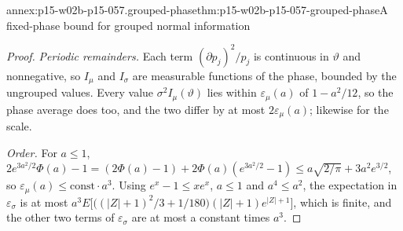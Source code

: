 \begin{annexitem}{annex:p15-w02b-p15-057.grouped-phase}{thm:p15-w02b-p15-057-grouped-phase}{A fixed-phase bound for grouped normal information}
\begin{proof}
\emph{Periodic remainders.} Each term \((\partial p_j)^2/p_j\) is
continuous in \(\vartheta\) and nonnegative, so \(I_\mu\) and \(I_\sigma\)
are measurable functions of the phase, bounded by the ungrouped values.
Every value \(\sigma^2I_\mu(\vartheta)\) lies within \(\varepsilon_\mu(a)\)
of \(1-a^2/12\), so the phase average does too, and the two differ by at
most \(2\varepsilon_\mu(a)\); likewise for the scale.

\emph{Order.} For \(a\leq1\),
\(2e^{3a^2/2}\Phi(a)-1=(2\Phi(a)-1)+2\Phi(a)(e^{3a^2/2}-1)\leq
a\sqrt{2/\pi}+3a^2e^{3/2}\), so \(\varepsilon_\mu(a)\leq\text{const}\cdot
a^3\). Using \(e^x-1\leq xe^x\), \(a\leq1\) and \(a^4\leq a^2\), the
expectation in \(\varepsilon_\sigma\) is at most
\(a^3E\bigl[\bigl((|Z|+1)^2/3+1/180\bigr)(|Z|+1)e^{|Z|+1}\bigr]\), which is
finite, and the other two terms of \(\varepsilon_\sigma\) are at most a
constant times \(a^3\).
\end{proof}
\end{annexitem}

